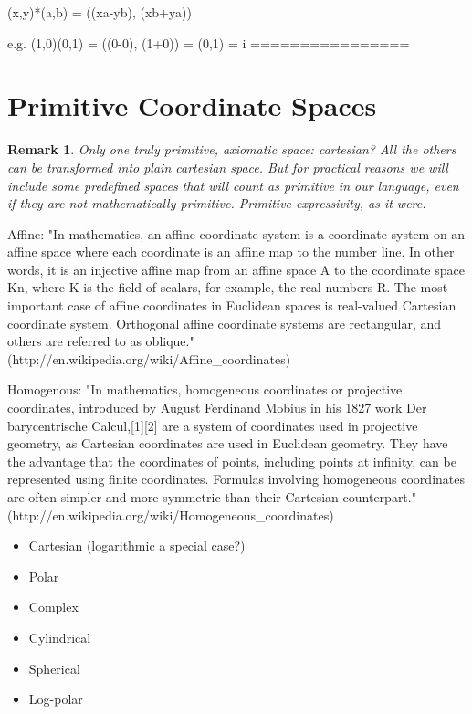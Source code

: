 \documentclass{tufte-handout}
\numberwithin{equation}{subsection}
\newtheorem{remark}{Remark}
\begin{document}
(x,y)*(a,b)   = ((xa-yb), (xb+ya))

e.g. (1,0)(0,1) = ((0-0), (1+0)) = (0,1) = i
================

\section{Primitive Coordinate Spaces}
\label{sec:primitives}

\begin{remark}
  Only one truly primitive, axiomatic space: cartesian?  All the
  others can be transformed into plain cartesian space.  But for
  practical reasons we will include some predefined spaces that will
  count as primitive in our language, even if they are not
  mathematically primitive.  Primitive expressivity, as it were.
\end{remark}

Affine:  "In mathematics, an affine coordinate system is a coordinate system on an affine space where each coordinate is an affine map to the number line. In other words, it is an injective affine map from an affine space A to the coordinate space Kn, where K is the field of scalars, for example, the real numbers R.  The most important case of affine coordinates in Euclidean spaces is real-valued Cartesian coordinate system. Orthogonal affine coordinate systems are rectangular, and others are referred to as oblique." (http://en.wikipedia.org/wiki/Affine\_coordinates)

Homogenous:  "In mathematics, homogeneous coordinates or projective coordinates, introduced by August Ferdinand Mobius in his 1827 work Der barycentrische Calcul,[1][2] are a system of coordinates used in projective geometry, as Cartesian coordinates are used in Euclidean geometry. They have the advantage that the coordinates of points, including points at infinity, can be represented using finite coordinates. Formulas involving homogeneous coordinates are often simpler and more symmetric than their Cartesian counterpart." (http://en.wikipedia.org/wiki/Homogeneous\_coordinates)

\begin{itemize}
\item Cartesian  (logarithmic a special case?)
\item Polar
\item Complex
\item Cylindrical
\item Spherical
\item Log-polar
\end{itemize}
\end{document}
